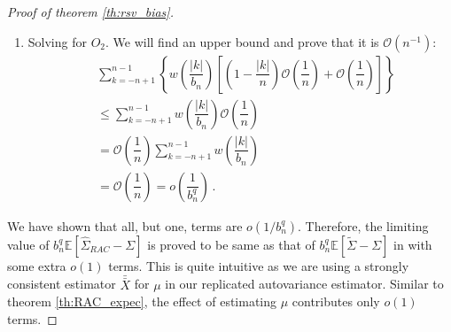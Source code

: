 \documentclass[11pt]{article}
\theoremstyle{remark}
\begin{document}
\begin{proof}[Proof of theorem \ref{th:rsv_bias}]
\begin{enumerate}
 \item Solving for $O_2$. We will find an upper bound and prove that it is $\mathcal{O}\left(n^{-1}\right)$:
 \begin{align*}
     & \sum_{k=-n+1}^{n-1}\left\{w\left(\dfrac{|k|}{b_n}\right)\left[\left(1-\dfrac{|k|}{n}\right)\mathcal{O}\left(\dfrac{1}{n}\right) + \mathcal{O}\left(\dfrac{1}{n}\right) \right] \right\} \\
     &\leq \sum_{k=-n+1}^{n-1}w\left(\dfrac{|k|}{b_n}\right)\mathcal{O}\left(\dfrac{1}{n}\right)\\
     &= \mathcal{O}\left(\dfrac{1}{n}\right) \sum_{k=-n+1}^{n-1}w\left(\dfrac{|k|}{b_n}\right) \\
     &= \mathcal{O}\left(\dfrac{1}{n}\right) = o\left(\dfrac{1}{b_n^q}\right) \,.
 \end{align*}
 \end{enumerate}  
%
 We have shown that all, but one, terms are $o(1/b_n^q)$. Therefore, the limiting value of $b_n^q\mathbb{E}[\hat{\Sigma}_{RAC} - \Sigma]$ is proved to be same as that of $b_n^q\mathbb{E}[\tilde{\Sigma} - \Sigma]$ in \cite{hannan2009multiple} with some extra $o(1)$ terms. This is quite intuitive as we are using a strongly consistent estimator $\bar{\bar{X}}$ for $\mu$ in our replicated autovariance estimator. Similar to theorem \ref{th:RAC_expec}, the effect of estimating $\mu$ contributes only $o(1)$ terms. 
\end{proof}
\end{document}
